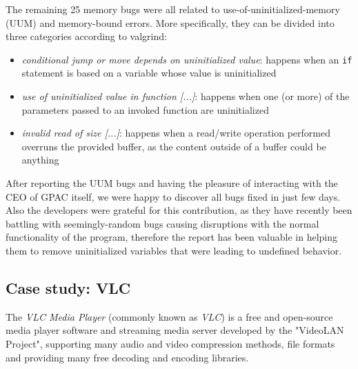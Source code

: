 The remaining 25 memory bugs were all related to use-of-uninitialized-memory (UUM) and memory-bound errors. More specifically, they can be divided into three categories according to valgrind:
\begin{itemize}
    \item \textit{conditional jump or move depends on uninitialized value}: happens when an \verb|if| statement is based on a variable whose value is uninitialized
    \item \textit{use of uninitialized value in function [...]}: happens when one (or more) of the parameters passed to an invoked function are uninitialized
    \item \textit{invalid read of size [...]}: happens when a read/write operation performed overruns the provided buffer, as the content outside of a buffer could be anything
\end{itemize}

After reporting the UUM bugs and having the pleasure of interacting with the CEO of GPAC itself, we were happy to discover all bugs fixed in just few days. Also the developers were grateful for this contribution, as they have recently been battling with seemingly-random bugs causing disruptions with the normal functionality of the program, therefore the report has been valuable in helping them to remove uninitialized variables that were leading to undefined behavior.




\newpage
\subsection{Case study: VLC}
The \textit{VLC Media Player} (commonly known as \textit{VLC}) \cite{vlc} is a free and open-source media player software and streaming media server developed by the "VideoLAN Project", supporting many audio and video compression methods, file formats and providing many free decoding and encoding libraries.

